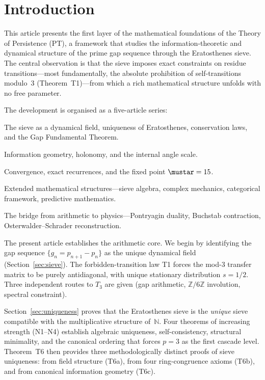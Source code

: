 \documentclass[12pt,a4paper]{article}
\begin{document}
\tableofcontents
\newpage

\section{Introduction}
\label{sec:intro}

This article presents the first layer of the mathematical foundations
of the Theory of Persistence (PT), a framework that studies the
information-theoretic and dynamical structure of the prime gap sequence
through the Eratosthenes sieve.  The central observation is that the
sieve imposes exact constraints on residue transitions---most
fundamentally, the absolute prohibition of self-transitions modulo~3
(Theorem~T1)---from which a rich mathematical structure unfolds with
no free parameter.

The development is organised as a five-article series:
\begin{description}[nosep]
\item[M1 (this article):] The sieve as a dynamical field, uniqueness
  of Eratosthenes, conservation laws, and the Gap Fundamental Theorem.
\item[M2:] Information geometry, holonomy, and the internal angle scale.
\item[M3:] Convergence, exact recurrences, and the fixed point
  $\mustar = 15$.
\item[M4:] Extended mathematical structures---sieve algebra, complex
  mechanics, categorical framework, predictive mathematics.
\item[M5:] The bridge from arithmetic to physics---Pontryagin duality,
  Buchstab contraction, Osterwalder--Schrader reconstruction.
\end{description}

The present article establishes the arithmetic core.  We begin by
identifying the gap sequence $\{g_n = p_{n+1} - p_n\}$ as the unique
dynamical field (Section~\ref{sec:sieve}).  The forbidden-transition
law T1 forces the mod-$3$ transfer matrix to be purely antidiagonal,
with unique stationary distribution $s = 1/2$.  Three independent routes to
$T_3$ are given (gap arithmetic, $\mathbb{Z}/6\mathbb{Z}$ involution,
spectral constraint).

Section~\ref{sec:uniqueness} proves that the Eratosthenes sieve is
the \emph{unique} sieve compatible with the multiplicative structure
of~$\mathbb{N}$.  Four theorems of increasing strength (N1--N4)
establish algebraic uniqueness, self-consistency, structural minimality,
and the canonical ordering that forces $p = 3$ as the first cascade
level.  Theorem~T6 then provides three methodologically distinct proofs of sieve
uniqueness: from field structure (T6a), from four ring-congruence
axioms (T6b), and from canonical information geometry (T6c).
\end{document}
